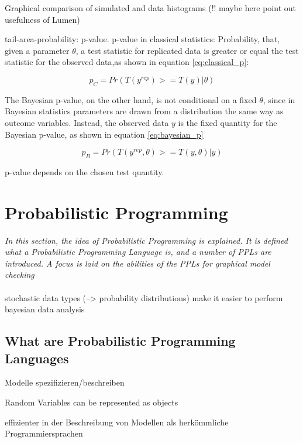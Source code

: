 \documentclass{article}
\begin{document}
Graphical comparison of simulated and data histograms (!! maybe here point out usefulness of Lumen)

tail-area-probability: p-value. p-value in classical statistics: Probability, that, given a parameter $\theta$, a test statistic for replicated data is greater or equal the test statistic for the observed data,as shown in equation \ref{eq:classical_p}:

\begin{equation}
p_C = Pr(T(y^{rep}) >= T(y) | \theta)
\label{eq:classical_p}
\end{equation}

\cite{1439840954}

The Bayesian p-value, on the other hand, is not conditional on a fixed $\theta$, since in Bayesian statistics parameters are drawn from a distribution the same way as outcome variables. Instead, the observed data $y$ is the fixed quantity for the Bayesian p-value, as shown in equation \ref{eq:bayesian_p}

\begin{equation}
p_B = Pr(T(y^{rep},\theta) >= T(y,\theta) | y)
\label{eq:bayesian_p}
\end{equation}

p-value depends on the chosen test quantity.


\section{Probabilistic Programming}

\textit{In this section,  the idea of Probabilistic Programming is explained. It is defined what a Probabilistic Programming Language is, and a number of PPLs are introduced. A focus is laid on the abilities of the PPLs for graphical model checking}
\\
\\
stochastic data types (--> probability distributions) make it easier to perform bayesian data analysis

\subsection{What are Probabilistic Programming Languages}

Modelle spezifizieren/beschreiben 

Random Variables can be represented as objects

\cite{wiki:Probabilisticprogramminglanguage}

effizienter in der Beschreibung von Modellen als herkömmliche Programmiersprachen \cite{Hardesty2015}
\end{document}
